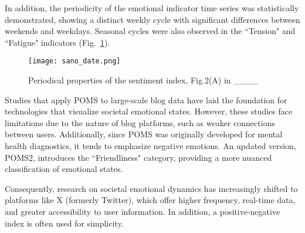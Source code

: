 In addition, the periodicity of the emotional indicator time series was statistically demonstrated, showing a distinct weekly cycle with significant differences between weekends and weekdays. Seasonal cycles were also observed in the ``Tension" and ``Fatigue" indicators (Fig.~\ref{fig2}).

\begin{figure}[htbp] \centering \texttt{[image: sano\_date.png]} \caption{Periodical properties of the sentiment index, Fig.2(A) in ____} \label{fig2} \end{figure}

Studies that apply POMS to large-scale blog data have laid the foundation for technologies that visualize societal emotional states. However, these studies face limitations due to the nature of blog platforms, such as weaker connections between users. Additionally, since POMS was originally developed for mental health diagnostics, it tends to emphasize negative emotions. An updated version, POMS2, introduces the ``Friendliness" category, providing a more nuanced classification of emotional states.

Consequently, research on societal emotional dynamics has increasingly shifted to platforms like X (formerly Twitter), which offer higher frequency, real-time data, and greater accessibility to user information. In addition, a positive-negative index is often used for simplicity.